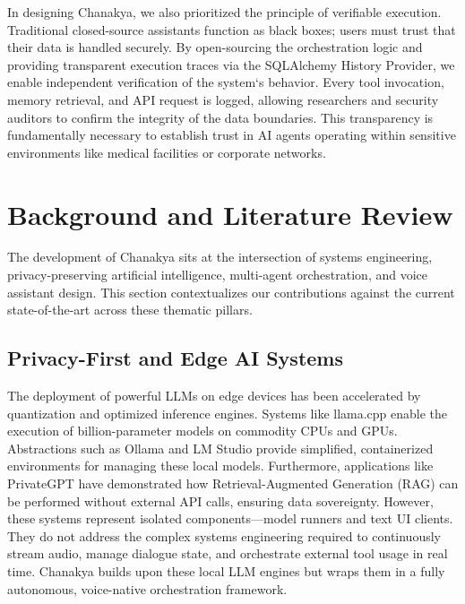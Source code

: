 \documentclass[conference]{IEEEtran}
\begin{document}
In designing Chanakya, we also prioritized the principle of verifiable execution. Traditional closed-source assistants function as black boxes; users must trust that their data is handled securely. By open-sourcing the orchestration logic and providing transparent execution traces via the SQLAlchemy History Provider, we enable independent verification of the system`s behavior. Every tool invocation, memory retrieval, and API request is logged, allowing researchers and security auditors to confirm the integrity of the data boundaries. This transparency is fundamentally necessary to establish trust in AI agents operating within sensitive environments like medical facilities or corporate networks.
\section{Background and Literature Review}

The development of Chanakya sits at the intersection of systems engineering, privacy-preserving artificial intelligence, multi-agent orchestration, and voice assistant design. This section contextualizes our contributions against the current state-of-the-art across these thematic pillars.

\subsection{Privacy-First and Edge AI Systems}
The deployment of powerful LLMs on edge devices has been accelerated by quantization and optimized inference engines. Systems like llama.cpp \cite{gerganov2023llamacpp} enable the execution of billion-parameter models on commodity CPUs and GPUs. Abstractions such as Ollama \cite{ollama2023} and LM Studio provide simplified, containerized environments for managing these local models. Furthermore, applications like PrivateGPT \cite{privategpt2023} have demonstrated how Retrieval-Augmented Generation (RAG) can be performed without external API calls, ensuring data sovereignty. However, these systems represent isolated components—model runners and text UI clients. They do not address the complex systems engineering required to continuously stream audio, manage dialogue state, and orchestrate external tool usage in real time. Chanakya builds upon these local LLM engines but wraps them in a fully autonomous, voice-native orchestration framework.
\end{document}
